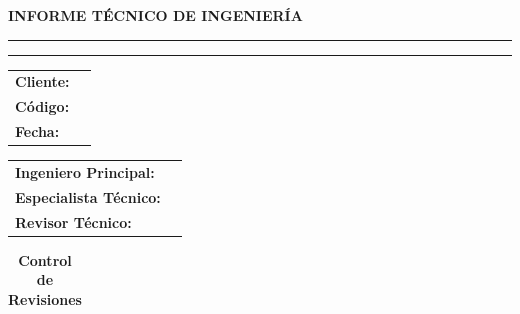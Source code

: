 \begin{titlepage}
	\thispagestyle{corporativo}

	\centering
	\vspace*{1cm}

	{\Large\bfseries INFORME TÉCNICO DE INGENIERÍA}

	\vspace{1cm}
	\rule{\linewidth}{0.4pt}

	\vspace{0.6cm}
	{\huge\bfseries \projecttitle}

	\vspace{0.6cm}
	\rule{\linewidth}{0.4pt}

	\vspace{2cm}

	\begin{table}[h]
		\raggedright
		\begin{tabular}{@{}ll@{}}
			\toprule

			\textbf{Cliente:} & \targetcompany \\
			\textbf{Código:}  & \documentcode  \\
			\textbf{Fecha:}   & \docFechaLarga \\
			\bottomrule
		\end{tabular}
	\end{table}

	\vspace{1cm}

	\begin{table}[h]
		\raggedright
		\begin{tabular}{@{}ll@{}}
			\toprule

			\textbf{Ingeniero Principal:}  & \firmaAprobo  \\
			\textbf{Especialista Técnico:} & \firmaElaboro \\
			\textbf{Revisor Técnico:}      & \firmaReviso  \\
			\bottomrule
		\end{tabular}
	\end{table}

	\vfill

	\vspace{1cm}
	\begin{table}[h]
		\centering
		\caption*{\textbf{Control de Revisiones}}
		\label{tab:control_revisiones}
		\begin{tabularx}{\textwidth}{@{}llXlll@{}}
			\toprule


\end{tabularx}
\end{table}
\end{titlepage}
